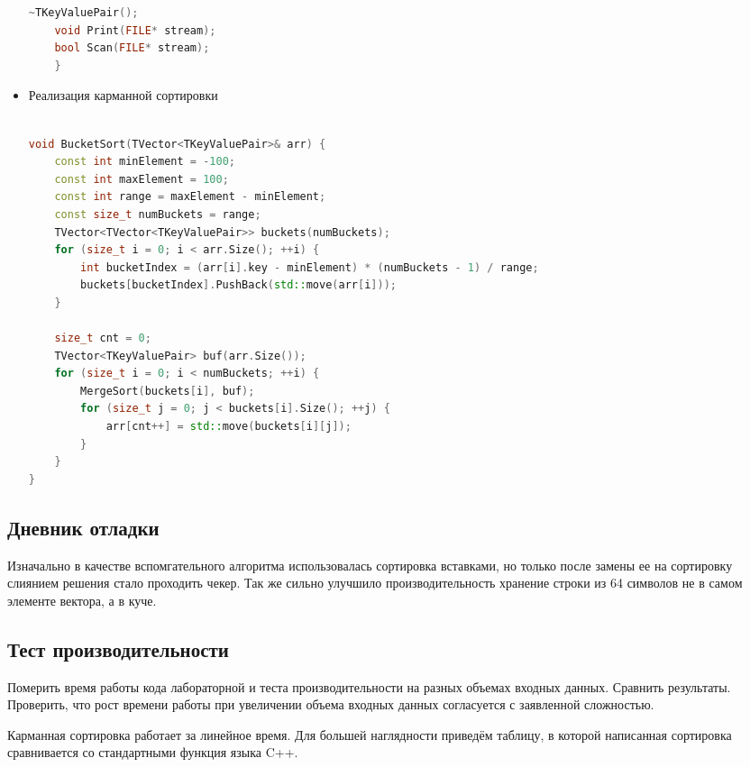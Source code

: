 \documentclass[12pt]{article}
\begin{document}
\begin{itemize}
\begin{lstlisting}[language=C++]
    ~TKeyValuePair();
    void Print(FILE* stream);
    bool Scan(FILE* stream);
    }
        \end{lstlisting}
    \item
        Реализация карманной сортировки
        \begin{lstlisting}[language=C++]

void BucketSort(TVector<TKeyValuePair>& arr) {
    const int minElement = -100;
    const int maxElement = 100;
    const int range = maxElement - minElement;
    const size_t numBuckets = range;
    TVector<TVector<TKeyValuePair>> buckets(numBuckets);
    for (size_t i = 0; i < arr.Size(); ++i) {
        int bucketIndex = (arr[i].key - minElement) * (numBuckets - 1) / range;
        buckets[bucketIndex].PushBack(std::move(arr[i]));
    }

    size_t cnt = 0;
    TVector<TKeyValuePair> buf(arr.Size());
    for (size_t i = 0; i < numBuckets; ++i) {
        MergeSort(buckets[i], buf);
        for (size_t j = 0; j < buckets[i].Size(); ++j) {
            arr[cnt++] = std::move(buckets[i][j]);
        }
    }
}
        \end{lstlisting}
\end{itemize}

\subsection*{Дневник отладки}

Изначально в качестве вспомгательного алгоритма использовалась сортировка вставками, но только после замены ее на сортировку слиянием решения стало проходить чекер.
Так же сильно улучшило производительность хранение строки из 64 символов не в самом элементе вектора, а в куче. 

\subsection*{Тест производительности}

Померить время работы кода лабораторной и теста производительности
на разных объемах входных данных. Сравнить результаты. Проверить,
что рост времени работы при увеличении объема входных данных
согласуется с заявленной сложностью.

Карманная сортировка работает за линейное время. Для большей наглядности приведём таблицу, в которой написанная сортировка сравнивается со стандартными функция языка C++.
\end{document}
